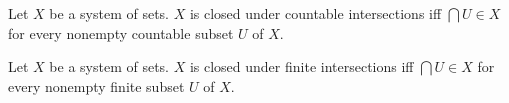 \documentclass[10pt]{article}
\begin{document}
  \begin{forthel}
    \begin{definition}
      Let $X$ be a system of sets.
      $X$ is closed under countable intersections iff $\bigcap U \in X$ for every nonempty countable subset $U$ of $X$.
    \end{definition}
  \end{forthel}

  \begin{forthel}
    \begin{definition}
      Let $X$ be a system of sets.
      $X$ is closed under finite intersections iff $\bigcap U \in X$ for every nonempty finite subset $U$ of $X$.
    \end{definition}
  \end{forthel}
\end{document}
